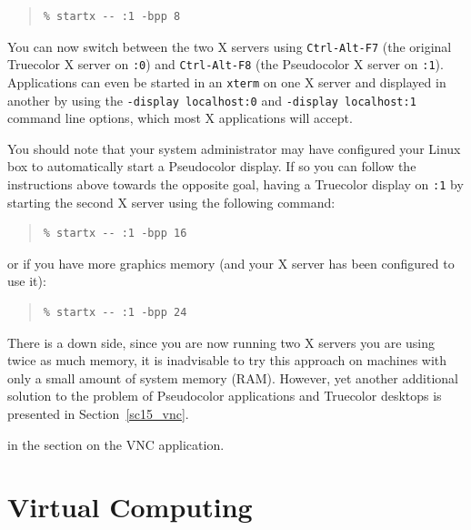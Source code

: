 \documentclass[twoside,11pt]{article}
\newcommand{\htmlref}[2]{#1}
\newcommand{\latex}[1]{#1}
\newcommand{\xlabel}[1]{}
\begin{document}
\small
\begin{quote}
\begin{verbatim}
% startx -- :1 -bpp 8
\end{verbatim}
\end{quote}
\normalsize

You can now switch between the two X servers using {\tt Ctrl-Alt-F7}
(the original Truecolor X server on {\tt :0}) and {\tt Ctrl-Alt-F8}
(the Pseudocolor X server on {\tt :1}). Applications can even be
started in an {\tt xterm} on one X server and displayed in another by
using the {\tt -display localhost:0} and {\tt -display localhost:1}
command line options, which most X applications will accept.

You should note that your system administrator may have configured
your Linux box to automatically start a Pseudocolor display. If so you
can follow the instructions above towards the opposite goal, having a
Truecolor display on {\tt :1} by starting the second X server using
the following command:

\small
\begin{quote}
\begin{verbatim}
% startx -- :1 -bpp 16
\end{verbatim}
\end{quote}
\normalsize

or if you have more graphics memory (and your X server has been configured to use it):

\small
\begin{quote}
\begin{verbatim}
% startx -- :1 -bpp 24
\end{verbatim}
\end{quote}
\normalsize

There is a down side, since you are now running two X servers you are
using twice as much memory, it is inadvisable to try this approach on
machines with only a small amount of system memory (RAM). However, yet
another additional solution to the problem of Pseudocolor applications
and Truecolor desktops is presented\latex{ in Section~\ref{sc15_vnc}.}
\begin{htmlonly}
in the section on the \htmlref{VNC}{sc15_vnc} application.
\end{htmlonly}

\section{\xlabel{sc15_virtual}Virtual Computing\label{sc15_virtual}}
\end{document}
